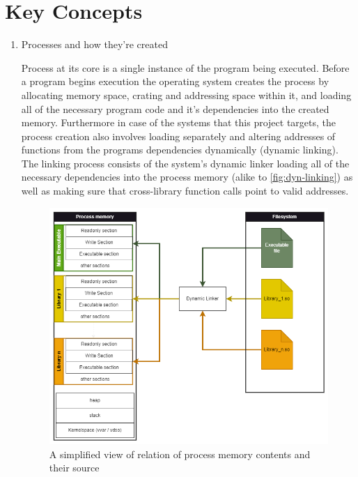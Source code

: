 \section{Key Concepts}

\begin{enumerate}
    \item {Processes and how they're created}

    Process at its core is a single instance of the program being executed.
    Before a program begins execution the operating system creates the process by allocating memory space, crating and addressing space within it, and loading all of the necessary program code and it's dependencies into the created memory.
    Furthermore in case of the systems that this project targets, the process creation also involves loading separately and altering addresses of functions from the programs dependencies dynamically (dynamic linking).
    The linking process consists of the system's dynamic linker loading all of the necessary dependencies into the process memory (alike to \autoref{fig:dyn-linking}) as well as making sure that cross-library function calls point to valid addresses.

    \begin{figure}[h]
        \centering
        \includegraphics[width=1\linewidth]{linking.drawio.png}
        \caption{A simplified view of relation of process memory contents and their source}
        \label{fig:dyn-linking}
    \end{figure}


\end{enumerate}

